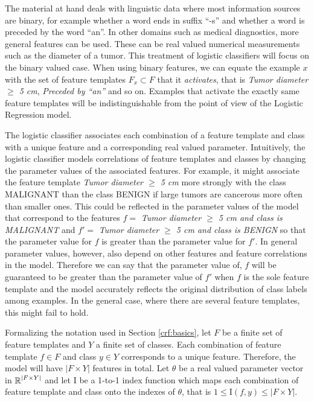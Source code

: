 The material at hand deals with linguistic data where most information
sources are binary, for example whether a word ends in suffix ``-s''
and whether a word is preceded by the word ``an''. In other domains
such as medical diagnostics, more general features can be used. These
can be real valued numerical measurements such as the diameter of a
tumor. This treatment of logistic classifiers will focus on the binary
valued case. When using binary features, we can equate the example $x$
with the set of feature templates $F_x \subset F$ that it {\it
  activates}, that is {\it Tumor diameter $\geq$ 5 cm}, {\it Preceded
  by ``an''} and so on. Examples that activate the exactly same
feature templates will be indistinguishable from the point of view of the
Logistic Regression model.

The logistic classifier associates each combination of a feature
template and class with a unique feature and a corresponding real
valued parameter. Intuitively, the logistic classifier models
correlations of feature templates and classes by changing the
parameter values of the associated features. For example, it might
associate the feature template {\it Tumor diameter $\geq$ 5 cm} more
strongly with the class MALIGNANT than the class BENIGN if large
tumors are cancerous more often than smaller ones. This could be
reflected in the parameter values of the model that correspond to the
features $f =$ {\it Tumor diameter $\geq$ 5 cm and class is MALIGNANT}
and $f' =$ {\it Tumor diameter $\geq$ 5 cm and class is BENIGN} so
that the parameter value for $f$ is greater than the parameter value
for $f'$. In general parameter values, however, also depend on other
features and feature correlations in the model. Therefore we can say
that the parameter value of, $f$ will be guaranteed to be greater than
the parameter value of $f'$ when $f$ is the sole feature template and
the model accurately reflects the original distribution of class
labels among examples. In the general case, where there are several
feature templates, this might fail to hold.

Formalizing the notation used in Section \ref{crf:basics}, let $F$ be
a finite set of feature templates and $Y$ a finite set of
classes. Each combination of feature template $f \in F$ and class $y
\in Y$ corresponds to a unique feature. Therefore, the model will have
$|F \times Y|$ features in total. Let $\theta$ be a real valued
parameter vector in $\mbox{$\mathbb R$}^{|F \times Y|}$ and let ${\mathrm I}$ be a
1-to-1 index function which maps each combination of feature template
and class onto the indexes of $\theta$, that is $1 \leq {\mathrm I}(f,
y) \leq |F \times Y|$.

